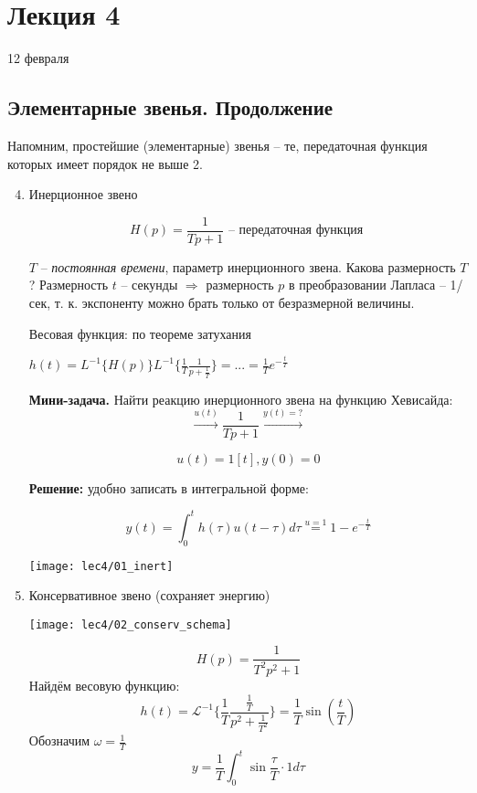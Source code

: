 \documentclass[main.tex]{subfiles}
\begin{document}
\section{ Лекция 4 }

12 февраля

\subsection{Элементарные звенья. Продолжение}

Напомним, простейшие (элементарные) звенья -- те, передаточная функция которых имеет порядок не выше 2.

\begin{enumerate}[noitemsep]
    \setcounter{enumi}{3} %
    \item Инерционное звено

    $$ H(p) = \frac{1}{Tp + 1} \text{ -- передаточная функция } $$

    $ T $ -- \emph{постоянная времени}, параметр инерционного звена.
    Какова размерность $T$?
    Размерность $t$ -- секунды $\Rightarrow$ размерность $p$ в преобразовании Лапласа -- 1/сек, т. к. экспоненту можно брать только от безразмерной величины.

    Весовая функция: по теореме затухания

    $ h(t) = L^{-1}\{H(p)\} L^{-1}\{\frac{1}{T} \frac{1}{p + \frac{1}{T}}\} = ... = \frac{1}{T}e^{-\frac{t}{T}} $

    \textbf{Мини-задача.} Найти реакцию инерционного звена на функцию Хевисайда:
    $$ \xrightarrow{u(t)} \boxed{\frac{1}{Tp+1}} \xrightarrow{y(t)=?} $$

    $$ u(t) = 1[t], y(0) = 0 $$

    \textbf{Решение:} удобно записать в интегральной форме:

    $$ y(t) = \int_0^t h(\tau) u(t-\tau) d\tau \overset{u = 1}= 1 - e^{-\frac{t}{T}} $$


    \texttt{[image: lec4/01\_inert]}

    \item Консервативное звено (сохраняет энергию)

    \texttt{[image: lec4/02\_conserv\_schema]}

    $$ H(p) = \frac{1}{T^2p^2 + 1} $$
    Найдём весовую функцию:
    $$ h(t) = \mathcal{L}^{-1}\{\frac{1}{T} \frac{\frac{1}{T}}{p^2 + \frac{1}{T^2}}\} = \frac{1}{T} \sin(\frac{t}{T}) $$
    Обозначим $ \omega = \frac{1}{T} $
    $$ y = \frac{1}{T} \int_0^t \sin \frac{\tau}{T} \cdot 1 d \tau $$


\end{enumerate}
\end{document}
